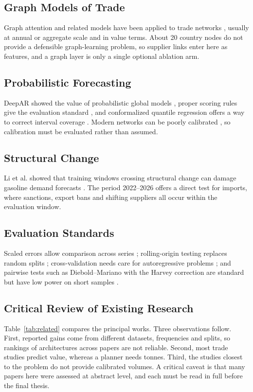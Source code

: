 \documentclass[conference]{IEEEtran}
\begin{document}
\subsection{Graph Models of Trade}
Graph attention \cite{velickovic2018} and related models have been applied to trade networks \cite{zhao2026,sellami2024}, usually at annual or aggregate scale and in value terms. About 20 country nodes do not provide a defensible graph-learning problem, so supplier links enter here as features, and a graph layer is only a single optional ablation arm.

\subsection{Probabilistic Forecasting}
DeepAR showed the value of probabilistic global models \cite{salinas2020}, proper scoring rules give the evaluation standard \cite{gneiting2007}, and conformalized quantile regression offers a way to correct interval coverage \cite{romano2019}. Modern networks can be poorly calibrated \cite{guo2017}, so calibration must be evaluated rather than assumed.

\subsection{Structural Change}
Li et al. showed that training windows crossing structural change can damage gasoline demand forecasts \cite{li2022}. The period 2022--2026 offers a direct test for imports, where sanctions, export bans and shifting suppliers all occur within the evaluation window.

\subsection{Evaluation Standards}
Scaled errors allow comparison across series \cite{hyndman2006}; rolling-origin testing replaces random splits \cite{tashman2000}; cross-validation needs care for autoregressive problems \cite{bergmeir2018}; and pairwise tests such as Diebold--Mariano with the Harvey correction are standard but have low power on short samples \cite{diebold1995,harvey1997}.

\subsection{Critical Review of Existing Research}
Table~\ref{tab:related} compares the principal works. Three observations follow. First, reported gains come from different datasets, frequencies and splits, so rankings of architectures across papers are not reliable. Second, most trade studies predict value, whereas a planner needs tonnes. Third, the studies closest to the problem do not provide calibrated volumes. A critical caveat is that many papers here were assessed at abstract level, and each must be read in full before the final thesis.
\end{document}
